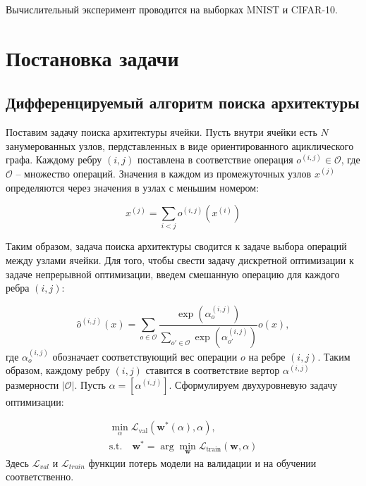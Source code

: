 \documentclass[12pt, twoside]{article}
\begin{document}
Вычислительный эксперимент проводится на выборках MNIST\cite{lecun-mnisthandwrittendigit-2010} и CIFAR-10\cite{cif}.

\section{Постановка задачи}

\subsection{Дифференцируемый алгоритм поиска архитектуры}

Поставим задачу поиска архитектуры ячейки.
 Пусть внутри ячейки есть $N$ занумерованных узлов, пердставленных в виде ориентированного ациклического графа. Каждому ребру $(i, j)$ поставлена в соответствие операция $o^{(i, j)} \in \mathcal{O}$, где $\mathcal{O}$ -- множество операций. Значения в каждом из промежуточных узлов $x^{(j)}$ определяются через значения в узлах с меньшим номером:
 
 \begin{equation}
 x^{(j)} = \sum_{i < j}o^{(i, j)}(x^{(i)})
 \end{equation}
 
 Таким образом, задача поиска архитектуры сводится к задаче выбора операций между узлами ячейки. Для того, чтобы свести задачу дискретной оптимизации к задаче непрерывной оптимизации, введем смешанную операцию для каждого ребра $(i, j)$:

\begin{equation}
\hat{o}^{(i, j)}(x) = \sum_{o\in \mathcal{O}} \frac{\exp(\alpha_o^{(i, j)})}{\sum_{o'\in\mathcal{O}} \exp(\alpha_{o'}^{(i, j)})}o(x),
\end{equation}
где $\alpha_o^{(i, j)}$ обозначает соответствующий вес операции $o$ на ребре $(i, j)$. Таким образом, каждому ребру $(i, j)$ ставится в соответствие вертор $\alpha^{(i, j)}$ размерности $|\mathcal{O}|$. Пусть $\alpha = [\alpha^{(i, j)}]$. Сформулируем двухуровневую задачу оптимизации:

\begin{equation}
\label{optim}
\begin{aligned}
\min_{\alpha}\mathcal{L}_\text{val}(\mathbf{w}^*(\alpha), \alpha),\\
 \mathrm{s.t.}\quad \mathbf{w}^* = \arg\min_{\mathbf{w}}\mathcal{L}_\text{train}(\mathbf{w}, \alpha)
 \end{aligned}
\end{equation}
Здесь $\mathcal{L}_{val}$ и $\mathcal{L}_{train}$ функции потерь модели на валидации и на обучении соответственно.
\end{document}
